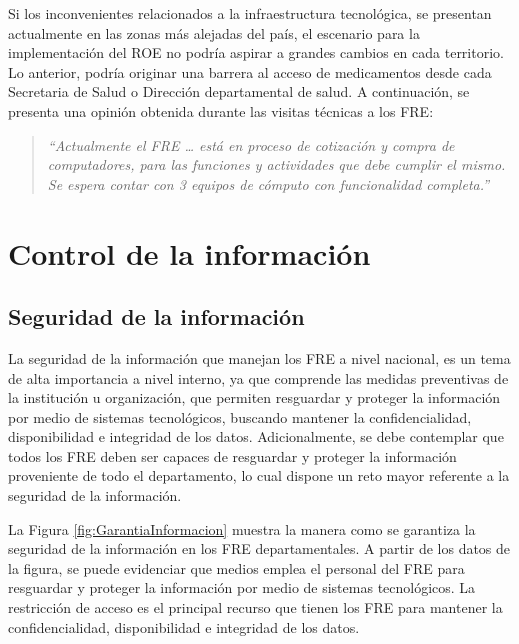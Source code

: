 \documentclass[
  oneside]{book}
\begin{document}
Si los inconvenientes relacionados a la infraestructura tecnológica, se presentan actualmente en las zonas más alejadas del país, el escenario para la implementación del ROE no podría aspirar a grandes cambios en cada territorio. Lo anterior, podría originar una barrera al acceso de medicamentos desde cada Secretaria de Salud o Dirección departamental de salud. A continuación, se presenta una opinión obtenida durante las visitas técnicas a los FRE:

\begin{quote}
\emph{``Actualmente el FRE \ldots{} está en proceso de cotización y compra de computadores, para las funciones y actividades que debe cumplir el mismo. Se espera contar con 3 equipos de cómputo con funcionalidad completa.''}
\end{quote}

\hypertarget{control-de-la-informaciuxf3n}{%
\section{Control de la información}\label{control-de-la-informaciuxf3n}}

\hypertarget{seguridad-de-la-informaciuxf3n}{%
\subsection{Seguridad de la información}\label{seguridad-de-la-informaciuxf3n}}

La seguridad de la información que manejan los FRE a nivel nacional, es un tema de alta importancia a nivel interno, ya que comprende las medidas preventivas de la institución u organización, que permiten resguardar y proteger la información por medio de sistemas tecnológicos, buscando mantener la confidencialidad, disponibilidad e integridad de los datos. Adicionalmente, se debe contemplar que todos los FRE deben ser capaces de resguardar y proteger la información proveniente de todo el departamento, lo cual dispone un reto mayor referente a la seguridad de la información.

La Figura \ref{fig:GarantiaInformacion} muestra la manera como se garantiza la seguridad de la información en los FRE departamentales. A partir de los datos de la figura, se puede evidenciar que medios emplea el personal del FRE para resguardar y proteger la información por medio de sistemas tecnológicos. La restricción de acceso es el principal recurso que tienen los FRE para mantener la confidencialidad, disponibilidad e integridad de los datos.
\end{document}
